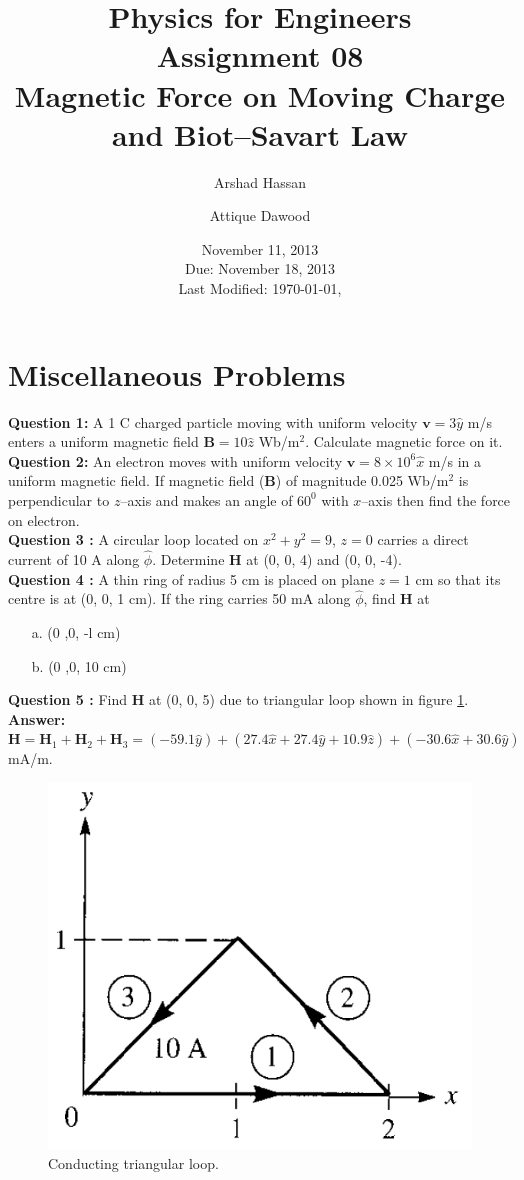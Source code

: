 \documentclass[12pt,a4paper]{article}
\title{\vspace{-3cm}Physics for Engineers\\Assignment 08\\Magnetic Force on Moving Charge and Biot--Savart Law}
\author{Arshad Hassan\and Attique Dawood}
\date{November 11, 2013\\Due: November 18, 2013\\[0.2cm] Last Modified: \today, \currenttime}
\begin{document}
\maketitle
\section{Miscellaneous Problems}
\noindent\textbf{Question 1:} A 1 C charged particle moving with uniform velocity $\textbf{v}=3\hat y$ m/s enters a uniform magnetic field $\textbf{B}=10\hat z$ Wb/m$^2$. Calculate magnetic force on it.\\[0.2cm]
\noindent\textbf{Question 2:} An electron moves with uniform velocity $\textbf{v}=8\times 10^6\hat x$ m/s in a uniform magnetic field. If magnetic field (\textbf{B}) of magnitude 0.025 Wb/m$^2$ is perpendicular to $z$--axis and makes an angle of $60^0$ with $x$--axis then find the force on electron.\\[0.2cm]
\noindent\textbf{Question 3 \cite[Example 7.3, page 270]{Sadiku}:} A circular loop located on $x^2+y^2=9$, $z=0$ carries a direct current of 10 A along $\hat\phi$. Determine \textbf{H} at (0, 0, 4) and (0, 0, -4).\\[0.2cm]
\noindent\textbf{Question 4 \cite[PE 7.3, page 271]{Sadiku}:} A thin ring of radius 5 cm is placed on plane $z=1$ cm so that its centre is at (0, 0, 1 cm). If the ring carries 50 mA along $\hat\phi$, find \textbf{H} at
\begin{itemize}
\item[a.] (0 ,0, -l cm)
\item[b.] (0 ,0, 10 cm)
\end{itemize}
\noindent\textbf{Question 5 \cite[Example 7.1, page 266]{Sadiku}:} Find \textbf{H} at (0, 0, 5) due to triangular loop shown in figure \ref{Conducting-triangular-loop}.\\
\textbf{Answer: }$\textbf{H}=\textbf{H}_1+\textbf{H}_2+\textbf{H}_3=(-59.1\hat y)+(27.4\hat x+27.4\hat y+10.9\hat z)+(-30.6\hat x+30.6\hat y)$ mA/m.
\begin{figure}[H]
\centering
\includegraphics[scale=0.45]{Figure7-6aS.png}
\caption{Conducting triangular loop.}
\label{Conducting-triangular-loop}
\end{figure}
\end{document}
